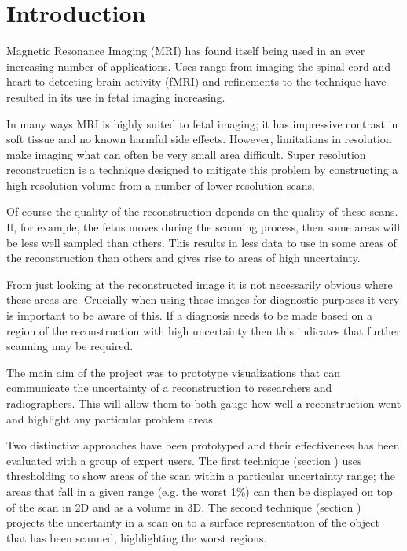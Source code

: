 \chapter{Introduction}


Magnetic Resonance Imaging (MRI) has found itself being used in an ever increasing number of applications. Uses range from imaging the spinal cord and heart to detecting brain activity (fMRI) and refinements to the technique have resulted in its use in fetal imaging increasing.

In many ways MRI is highly suited to fetal imaging; it has impressive contrast in soft tissue and no known harmful side effects. However, limitations in resolution make imaging what can often be very small area difficult. Super resolution reconstruction is a technique designed to mitigate this problem by constructing a high resolution volume from a number of lower resolution scans.

Of course the quality of the reconstruction depends on the quality of these scans. If, for example, the fetus moves during the scanning process, then some areas will be less well sampled than others. This results in less data to use in some areas of the reconstruction than others and gives rise to areas of high uncertainty.
 
From just looking at the reconstructed image it is not necessarily obvious where these areas are. Crucially when using these images for diagnostic purposes it very is important to be aware of this. If a diagnosis needs to be made based on a region of the reconstruction with high uncertainty then this indicates that further scanning may be required.


The main aim of the project was to prototype visualizations that can communicate the uncertainty of a reconstruction to researchers and radiographers. This will allow them to both gauge how well a reconstruction went and highlight any particular problem areas.

Two distinctive approaches have been prototyped and their effectiveness has been evaluated with a group of expert users. The first technique (section \cite{section:thresholding}) uses thresholding to show areas of the scan within a particular uncertainty range; the areas that fall in a given range (e.g. the worst 1\%) can then be displayed on top of the scan in 2D and as a volume in 3D. The second technique (section \cite{section:uncertaintysurface}) projects the uncertainty in a scan on to a surface representation of the object that has been scanned, highlighting the worst regions.

